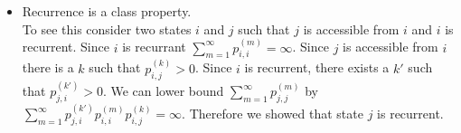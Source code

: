 \begin{itemize}
%
%
%
%
%


\item Recurrence is a class property.\\
To see this consider two states $i$ and $j$ such that $j$ is
accessible from $i$ and $i$ is recurrent. Since $i$ is recurrant
$\sum\nolimits_{m = 1}^\infty {p_{i,i}^{(m)}}  = \infty $. Since $j$
is accessible from $i$ there is a $k$ such that $p_{i,j}^{(k)}
>0$. Since $i$ is recurrent, there exists a $k'$ such that
$p_{j,i}^{(k')}>0$. We can lower bound $\sum\nolimits_{m = 1}^\infty
{p_{j,j}^{(m)}}$ by $\sum_{m = 1}^\infty
{p_{j,i}^{(k')}}{p_{i,i}^{(m)}} {p_{i,j}^{(k)}} = \infty $.
Therefore we showed that state $j$ is recurrent.



\end{itemize}
